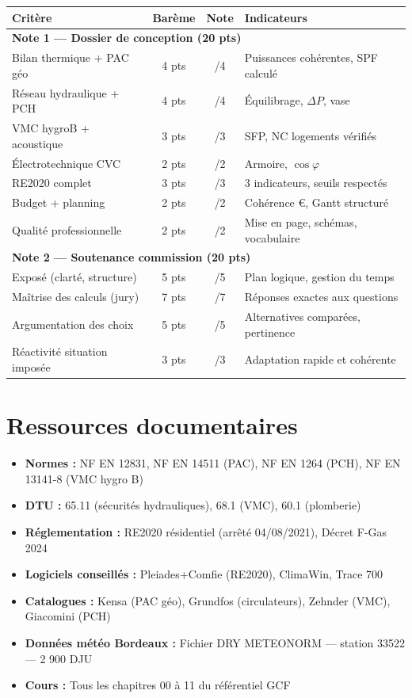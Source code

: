 \begin{center}
\begin{tabular}{p{6cm}ccp{4cm}}
  \toprule
  \textbf{Critère} & \textbf{Barème} & \textbf{Note} & \textbf{Indicateurs} \\
  \midrule
  \multicolumn{4}{l}{\textbf{Note 1 — Dossier de conception (20 pts)}} \\
  \midrule
  Bilan thermique + PAC géo & 4 pts & /4 & Puissances cohérentes, SPF calculé \\
  Réseau hydraulique + PCH & 4 pts & /4 & Équilibrage, $\Delta P$, vase \\
  VMC hygroB + acoustique & 3 pts & /3 & SFP, NC logements vérifiés \\
  Électrotechnique CVC & 2 pts & /2 & Armoire, $\cos\varphi$ \\
  RE2020 complet & 3 pts & /3 & 3 indicateurs, seuils respectés \\
  Budget + planning & 2 pts & /2 & Cohérence €, Gantt structuré \\
  Qualité professionnelle & 2 pts & /2 & Mise en page, schémas, vocabulaire \\
  \midrule
  \multicolumn{4}{l}{\textbf{Note 2 — Soutenance commission (20 pts)}} \\
  \midrule
  Exposé (clarté, structure) & 5 pts & /5 & Plan logique, gestion du temps \\
  Maîtrise des calculs (jury) & 7 pts & /7 & Réponses exactes aux questions \\
  Argumentation des choix & 5 pts & /5 & Alternatives comparées, pertinence \\
  Réactivité situation imposée & 3 pts & /3 & Adaptation rapide et cohérente \\
  \bottomrule
\end{tabular}
\end{center}

\section{Ressources documentaires}

\begin{itemize}
  \item \textbf{Normes :} NF EN 12831, NF EN 14511 (PAC), NF EN 1264 (PCH), NF EN 13141-8 (VMC hygro B)
  \item \textbf{DTU :} 65.11 (sécurités hydrauliques), 68.1 (VMC), 60.1 (plomberie)
  \item \textbf{Réglementation :} RE2020 résidentiel (arrêté 04/08/2021), Décret F-Gas 2024
  \item \textbf{Logiciels conseillés :} Pleiades+Comfie (RE2020), ClimaWin, Trace 700
  \item \textbf{Catalogues :} Kensa (PAC géo), Grundfos (circulateurs), Zehnder (VMC), Giacomini (PCH)
  \item \textbf{Données météo Bordeaux :} Fichier DRY METEONORM — station 33522 — 2 900 DJU
  \item \textbf{Cours :} Tous les chapitres 00 à 11 du référentiel GCF
\end{itemize}

\finchapitre
